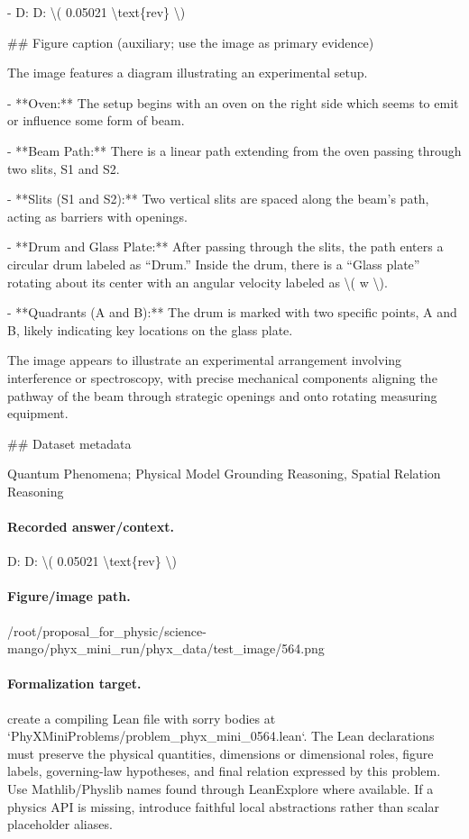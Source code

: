 - D: D: \textbackslash{}( 0.05021 \textbackslash{}text\{rev\} \textbackslash{})

\#\# Figure caption (auxiliary; use the image as primary evidence)

The image features a diagram illustrating an experimental setup.

- **Oven:** The setup begins with an oven on the right side which seems to emit or influence some form of beam.
  
- **Beam Path:** There is a linear path extending from the oven passing through two slits, S1 and S2.

- **Slits (S1 and S2):** Two vertical slits are spaced along the beam's path, acting as barriers with openings.

- **Drum and Glass Plate:** After passing through the slits, the path enters a circular drum labeled as “Drum.” Inside the drum, there is a “Glass plate” rotating about its center with an angular velocity labeled as \textbackslash{}( w \textbackslash{}).

- **Quadrants (A and B):** The drum is marked with two specific points, A and B, likely indicating key locations on the glass plate. 

The image appears to illustrate an experimental arrangement involving interference or spectroscopy, with precise mechanical components aligning the pathway of the beam through strategic openings and onto rotating measuring equipment.

\#\# Dataset metadata

Quantum Phenomena; Physical Model Grounding Reasoning, Spatial Relation Reasoning

\paragraph{Recorded answer/context.}
D: D: \textbackslash{}( 0.05021 \textbackslash{}text\{rev\} \textbackslash{})

\paragraph{Figure/image path.}
/root/proposal\_for\_physic/science-mango/phyx\_mini\_run/phyx\_data/test\_image/564.png

\paragraph{Formalization target.}
create a compiling Lean file with sorry bodies at `PhyXMiniProblems/problem\_phyx\_mini\_0564.lean`. The Lean declarations must preserve the physical quantities, dimensions or dimensional roles, figure labels, governing-law hypotheses, and final relation expressed by this problem.
Use Mathlib/Physlib names found through LeanExplore where available. If a physics API is missing, introduce faithful local abstractions rather than scalar placeholder aliases.

